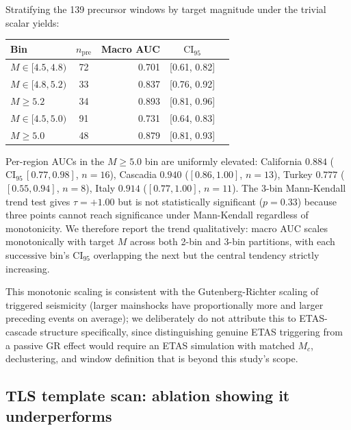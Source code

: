 \documentclass[11pt]{article}
\begin{document}
Stratifying the 139 precursor windows by target magnitude under the
trivial scalar yields:

\begin{center}
\begin{tabular}{lcrcc}
\toprule
Bin & $n_\mathrm{pre}$ & Macro AUC & $\mathrm{CI}_{95}$ \\
\midrule
$M \in [4.5, 4.8)$ & 72 & 0.701 & [0.61, 0.82] \\
$M \in [4.8, 5.2)$ & 33 & 0.837 & [0.76, 0.92] \\
$M \ge 5.2$        & 34 & 0.893 & [0.81, 0.96] \\
\midrule
$M \in [4.5, 5.0)$ & 91 & 0.731 & [0.64, 0.83] \\
$M \ge 5.0$        & 48 & 0.879 & [0.81, 0.93] \\
\bottomrule
\end{tabular}
\end{center}

Per-region AUCs in the $M \ge 5.0$ bin are uniformly elevated:
California $0.884$ ($\mathrm{CI}_{95}\,[0.77, 0.98]$, $n=16$), Cascadia
$0.940$ ($[0.86, 1.00]$, $n=13$), Turkey $0.777$ ($[0.55, 0.94]$,
$n=8$), Italy $0.914$ ($[0.77, 1.00]$, $n=11$). The 3-bin Mann-Kendall
trend test gives $\tau = +1.00$ but is not statistically significant
($p = 0.33$) because three points cannot reach significance under
Mann-Kendall regardless of monotonicity. We therefore report the
trend qualitatively: macro AUC scales monotonically with target $M$
across both 2-bin and 3-bin partitions, with each successive bin's
$\mathrm{CI}_{95}$ overlapping the next but the central tendency
strictly increasing.

This monotonic scaling is consistent with the Gutenberg-Richter
scaling of triggered seismicity (larger mainshocks have proportionally
more and larger preceding events on average); we deliberately do not
attribute this to ETAS-cascade structure specifically, since
distinguishing genuine ETAS triggering from a passive GR effect
would require an ETAS simulation with matched $M_c$, declustering, and
window definition that is beyond this study's scope.

\subsection{TLS template scan: ablation showing it underperforms}
\label{sec:results-ablation}
\end{document}

